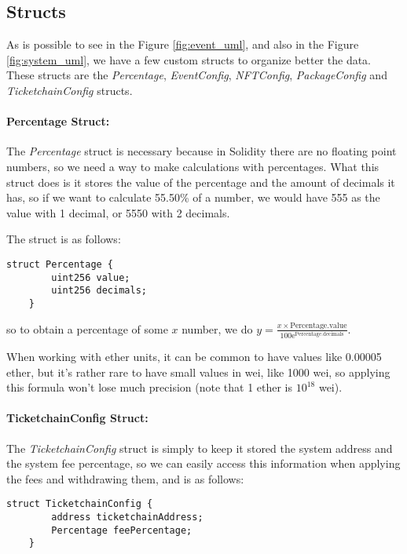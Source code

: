 \subsection{Structs}
\label{subsec:structs}

As is possible to see in the Figure \ref{fig:event_uml}, and also in the Figure
\ref{fig:system_uml}, we have a few custom structs to organize better the data.
These structs are the \textit{Percentage}, \textit{EventConfig},
\textit{NFTConfig}, \textit{PackageConfig} and \textit{TicketchainConfig}
structs.

\paragraph{Percentage Struct:} The \textit{Percentage} struct is necessary because in Solidity there are no
floating point numbers, so we need a way to make calculations with percentages.
What this struct does is it stores the value of the percentage and the amount
of decimals it has, so if we want to calculate 55.50\% of a number, we would
have 555 as the value with 1 decimal, or 5550 with 2 decimals.

The struct is as follows:
\begin{lstlisting}[caption=Percentage struct]
    struct Percentage {
        uint256 value;
        uint256 decimals;
    }
\end{lstlisting}
so to obtain a percentage of some $x$ number, we do $y = \frac{x \times
		\text{Percentage.value}}{100\mathrm{e}^\text{Percentage.decimals}}$.

When working with ether units, it can be common to have values like 0.00005
ether, but it's rather rare to have small values in wei, like 1000 wei, so
applying this formula won't lose much precision (note that 1 ether is $10^{18}$
wei).

\paragraph{TicketchainConfig Struct:} The \textit{TicketchainConfig} struct is simply to keep it stored the system
address and the system fee percentage, so we can easily access this information
when applying the fees and withdrawing them, and is as follows:
\begin{lstlisting}[caption=TicketchainConfig struct]
    struct TicketchainConfig {
        address ticketchainAddress;
        Percentage feePercentage;
    }
\end{lstlisting}

